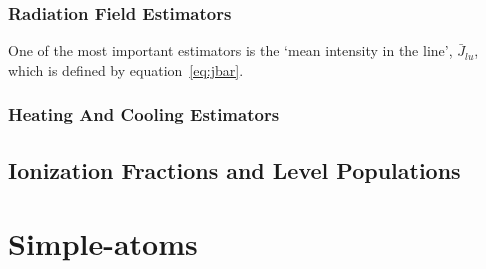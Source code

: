 \subsubsection{Radiation Field Estimators}

One of the most important estimators is the `mean intensity in the line', $\bar{J}_{lu}$,
which is defined by equation~\ref{eq:jbar}. 


\subsubsection{Heating And Cooling Estimators}

\subsection{Ionization Fractions and Level Populations}




\section{Simple-atoms}



